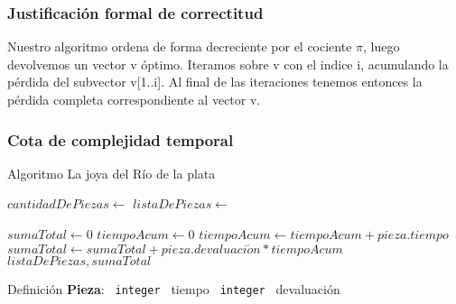 \documentclass[11pt, a4paper, twoside]{article}
\begin{document}
\subsubsection{Justificación formal de correctitud}
Nuestro algoritmo ordena de forma decreciente por el cociente $\pi$, luego devolvemos un vector v óptimo. Iteramos sobre v con el indice i, acumulando la pérdida del subvector v[1..i]. Al final de las iteraciones tenemos entonces la pérdida completa correspondiente al vector v.

\newpage

\subsubsection{Cota de complejidad temporal}

\begin{algorithm}
\caption{Algoritmo La joya del Río de la plata}\label{logpascual}
\footnotesize\begin{algorithmic}[1]
	\Require
		\Statex $cantidadDePiezas \gets$  
		\Statex $listaDePiezas \gets$  
	\Ensure
		\Statex {} 
	\Statex
	
  \State $sumaTotal \gets 0$ 
  \State $tiempoAcum \gets 0$ 
  \State {} 
   
    \State $tiempoAcum \gets tiempoAcum + pieza.tiempo$ 
    \State $sumaTotal \gets sumaTotal + pieza.devaluaci\acute{o}n * tiempoAcum $ 
    \EndFor {}
  \State \Return $listaDePiezas, sumaTotal$
  \State

  \Statex{}
   
   
    \State {} 
  \Else
    \State {}
  \EndIf
	\EndFunction {}
  \State

  \Statex
  \State Definición \textbf{Pieza}:
  \State \texttt{ integer } tiempo 
  \State \texttt{ integer } devaluación 
	\Statex{}
	
\end{algorithmic}
\end{algorithm}
\end{document}
